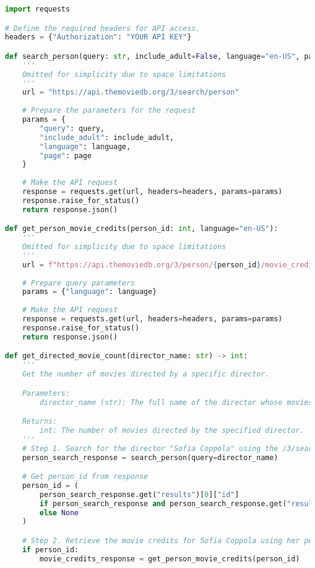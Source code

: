 \begin{figure*}[ht]
\centering
\tiny
\begin{lstlisting}[language=python, basicstyle=\ttfamily\tiny]
import requests

# Define the required headers for API access.
headers = {"Authorization": "YOUR API KEY"}

def search_person(query: str, include_adult=False, language="en-US", page=1):
    '''
    Omitted for simplicity due to space limitations
    '''
    url = "https://api.themoviedb.org/3/search/person"
    
    # Prepare the parameters for the request
    params = {
        "query": query,
        "include_adult": include_adult,
        "language": language,
        "page": page
    }
    
    # Make the API request
    response = requests.get(url, headers=headers, params=params)
    response.raise_for_status()
    return response.json()

def get_person_movie_credits(person_id: int, language="en-US"):
    '''
    Omitted for simplicity due to space limitations
    '''
    url = f"https://api.themoviedb.org/3/person/{person_id}/movie_credits"
    
    # Prepare query parameters
    params = {"language": language}
    
    # Make the API request
    response = requests.get(url, headers=headers, params=params)
    response.raise_for_status()
    return response.json()

def get_directed_movie_count(director_name: str) -> int:
    '''
    Get the number of movies directed by a specific director.

    Parameters:
        director_name (str): The full name of the director whose movies to count.

    Returns:
        int: The number of movies directed by the specified director.
    '''
    # Step 1. Search for the director "Sofia Coppola" using the /3/search/person API to find her person_id.
    person_search_response = search_person(query=director_name)

    # Get person_id from response
    person_id = (
        person_search_response.get("results")[0]["id"]
        if person_search_response and person_search_response.get("results")
        else None
    )

    # Step 2. Retrieve the movie credits for Sofia Coppola using her person_id with the /3/person/{person_id}/movie_credits API.
    if person_id:
        movie_credits_response = get_person_movie_credits(person_id)


\end{lstlisting}
\end{figure*}
